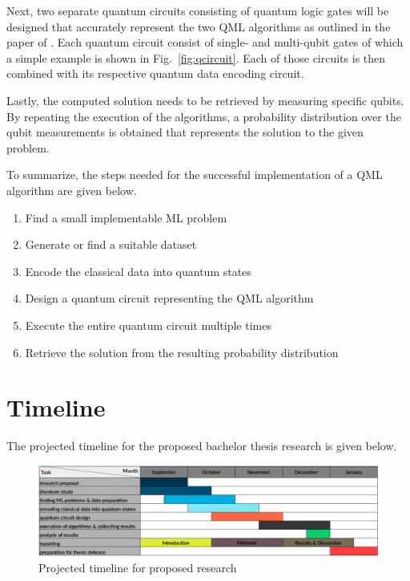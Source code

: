 \documentclass[a4paper]{article}
\newcommand*{\0}{$\ket{0}$}
\newcommand*{\1}{$\ket{1}$}
\begin{document}
Next, two separate quantum circuits consisting of quantum logic gates will be designed that accurately represent the two QML algorithms as outlined in the paper of \cite{Schuld2014, Schuld2016}. Each quantum circuit consist of single- and multi-qubit gates of which a simple example is shown in Fig.~\ref{fig:qcircuit}. Each of those circuits is then combined with its respective quantum data encoding circuit.

Lastly, the computed solution needs to be retrieved by measuring specific qubits. By repeating the execution of the algorithms, a probability distribution over the qubit measurements is obtained that represents the solution to the given problem.

To summarize, the steps needed for the successful implementation of a QML algorithm are given below.

\begin{enumerate}
\item Find a small implementable ML problem
\item Generate or find a suitable dataset
\item Encode the classical data into quantum states
\item Design a quantum circuit representing the QML algorithm
\item Execute the entire quantum circuit multiple times
\item Retrieve the solution from the resulting probability distribution
\end{enumerate}

\section{Timeline}
\label{sec:timeline}

The projected timeline for the proposed bachelor thesis research is given below.

\begin{figure}[!ht]
\centering
\includegraphics[scale=0.385]{ready_timeline.png}
\caption{Projected timeline for proposed research}
\end{figure}
\end{document}
